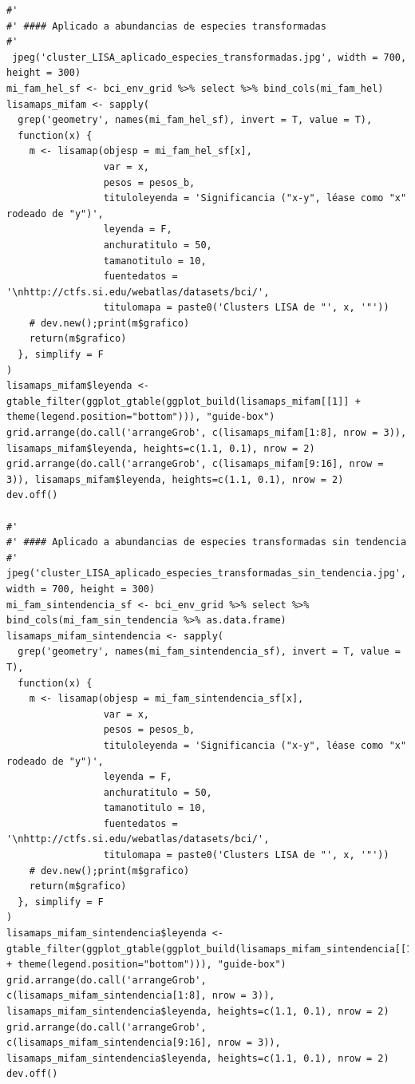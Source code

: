 \documentclass[11pt,]{article}
\begin{document}
\begin{verbatim}
#' 
#' #### Aplicado a abundancias de especies transformadas
#' 
 jpeg('cluster_LISA_aplicado_especies_transformadas.jpg', width = 700, height = 300)
mi_fam_hel_sf <- bci_env_grid %>% select %>% bind_cols(mi_fam_hel)
lisamaps_mifam <- sapply(
  grep('geometry', names(mi_fam_hel_sf), invert = T, value = T),
  function(x) {
    m <- lisamap(objesp = mi_fam_hel_sf[x],
                 var = x,
                 pesos = pesos_b,
                 tituloleyenda = 'Significancia ("x-y", léase como "x" rodeado de "y")',
                 leyenda = F,
                 anchuratitulo = 50,
                 tamanotitulo = 10,
                 fuentedatos = '\nhttp://ctfs.si.edu/webatlas/datasets/bci/',
                 titulomapa = paste0('Clusters LISA de "', x, '"'))
    # dev.new();print(m$grafico)
    return(m$grafico)
  }, simplify = F
)
lisamaps_mifam$leyenda <- gtable_filter(ggplot_gtable(ggplot_build(lisamaps_mifam[[1]] + theme(legend.position="bottom"))), "guide-box")
grid.arrange(do.call('arrangeGrob', c(lisamaps_mifam[1:8], nrow = 3)), lisamaps_mifam$leyenda, heights=c(1.1, 0.1), nrow = 2)
grid.arrange(do.call('arrangeGrob', c(lisamaps_mifam[9:16], nrow = 3)), lisamaps_mifam$leyenda, heights=c(1.1, 0.1), nrow = 2)
dev.off()

#' 
#' #### Aplicado a abundancias de especies transformadas sin tendencia
#'
jpeg('cluster_LISA_aplicado_especies_transformadas_sin_tendencia.jpg', width = 700, height = 300) 
mi_fam_sintendencia_sf <- bci_env_grid %>% select %>% bind_cols(mi_fam_sin_tendencia %>% as.data.frame)
lisamaps_mifam_sintendencia <- sapply(
  grep('geometry', names(mi_fam_sintendencia_sf), invert = T, value = T),
  function(x) {
    m <- lisamap(objesp = mi_fam_sintendencia_sf[x],
                 var = x,
                 pesos = pesos_b,
                 tituloleyenda = 'Significancia ("x-y", léase como "x" rodeado de "y")',
                 leyenda = F,
                 anchuratitulo = 50,
                 tamanotitulo = 10,
                 fuentedatos = '\nhttp://ctfs.si.edu/webatlas/datasets/bci/',
                 titulomapa = paste0('Clusters LISA de "', x, '"'))
    # dev.new();print(m$grafico)
    return(m$grafico)
  }, simplify = F
)
lisamaps_mifam_sintendencia$leyenda <- gtable_filter(ggplot_gtable(ggplot_build(lisamaps_mifam_sintendencia[[1]] + theme(legend.position="bottom"))), "guide-box")
grid.arrange(do.call('arrangeGrob', c(lisamaps_mifam_sintendencia[1:8], nrow = 3)), lisamaps_mifam_sintendencia$leyenda, heights=c(1.1, 0.1), nrow = 2)
grid.arrange(do.call('arrangeGrob', c(lisamaps_mifam_sintendencia[9:16], nrow = 3)), lisamaps_mifam_sintendencia$leyenda, heights=c(1.1, 0.1), nrow = 2)
dev.off()
\end{verbatim}
\end{document}
